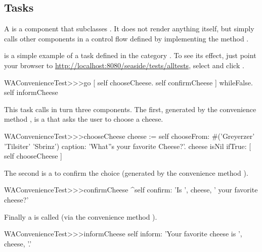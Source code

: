 \documentclass[a4paper,10pt,twoside]{book}
\begin{document}
\subsection{Tasks}

A  is a component that subclasses .
It does not render anything itself, but simply calls other components in a control flow defined by implementing the method .

 is a simple example of a task defined in the category .
To see its effect, just point your browser to \url{http://localhost:8080/seaside/tests/alltests}, select  and click .

\begin{code}{}
WAConvenienceTest>>>go
	[ self chooseCheese.
	  self confirmCheese ] whileFalse.
	self informCheese
\end{code}

This task calls in turn three components.
The first, generated by the convenience method , is a  that asks the user to choose a cheese.

\begin{code}{}
WAConvenienceTest>>>chooseCheese
	cheese := self
		chooseFrom: #('Greyerzer' 'Tilsiter' 'Sbrinz')
		caption: 'What''s your favorite Cheese?'.
	cheese isNil ifTrue: [ self chooseCheese ]
\end{code}


The second is a  to confirm the choice (generated by the convenience method ).

\begin{code}{}
WAConvenienceTest>>>confirmCheese
	^self confirm: 'Is ', cheese,  ' your favorite cheese?'
\end{code}

Finally a  is called (via the convenience method ).

\begin{code}{}
WAConvenienceTest>>>informCheese
	self inform: 'Your favorite cheese is ', cheese, '.'
\end{code}
\end{document}

